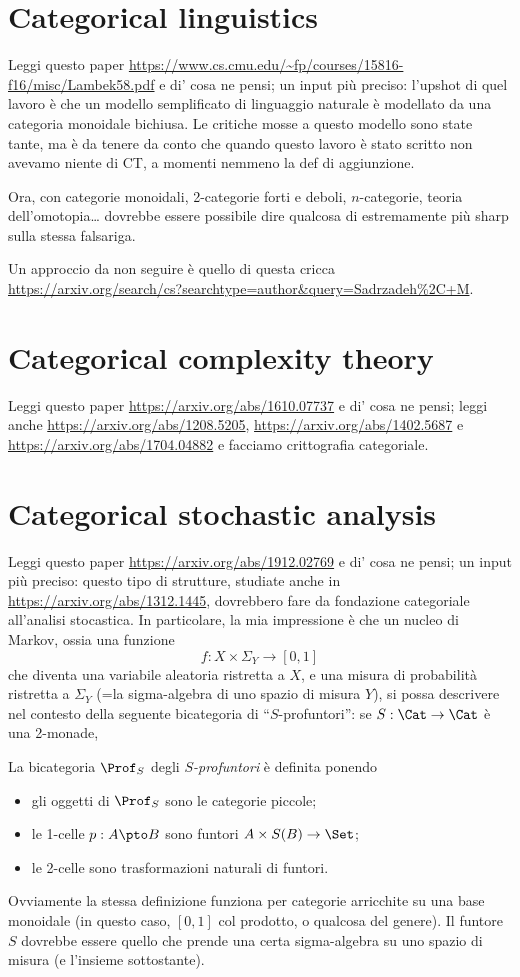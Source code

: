 \documentclass{amsart}
\begin{document}
\section{Categorical linguistics}
Leggi questo paper \url{https://www.cs.cmu.edu/~fp/courses/15816-f16/misc/Lambek58.pdf} e di' cosa ne pensi; un input più preciso: l'upshot di quel lavoro è che un modello semplificato di linguaggio naturale è modellato da una categoria monoidale bichiusa. Le critiche mosse a questo modello sono state tante, ma è da tenere da conto che quando questo lavoro è stato scritto non avevamo niente di CT, a momenti nemmeno la def di aggiunzione.

Ora, con categorie monoidali, 2-categorie forti e deboli, $n$-categorie, teoria dell'omotopia\dots{} dovrebbe essere possibile dire qualcosa di estremamente più sharp sulla stessa falsariga.

Un approccio da non seguire è quello di questa cricca \url{https://arxiv.org/search/cs?searchtype=author&query=Sadrzadeh%2C+M}.
\section{Categorical complexity theory}
Leggi questo paper \url{https://arxiv.org/abs/1610.07737} e di' cosa ne pensi; leggi anche \url{https://arxiv.org/abs/1208.5205}, \url{https://arxiv.org/abs/1402.5687} e \url{https://arxiv.org/abs/1704.04882} e facciamo crittografia categoriale.
\section{Categorical stochastic analysis}
Leggi questo paper \url{https://arxiv.org/abs/1912.02769} e di' cosa ne pensi; un input più preciso: questo tipo di strutture, studiate anche in \url{https://arxiv.org/abs/1312.1445}, dovrebbero fare da fondazione categoriale all'analisi stocastica. In particolare, la mia impressione è che un nucleo di Markov, ossia una funzione
\[
f : X \times \Sigma_Y \to [0,1]
\]
che diventa una variabile aleatoria ristretta a $X$, e una misura di probabilità ristretta a $\Sigma_Y$ (=la sigma-algebra di uno spazio di misura $Y$), si possa descrivere nel contesto della seguente bicategoria di ``$S$-profuntori'': se $S : \Cat \to \Cat$ è una 2-monade,
\begin{definition}
  La bicategoria $\Prof_S$ degli \emph{$S$-profuntori} è definita ponendo 
  \begin{itemize}
    \item gli oggetti di $\Prof_S$ sono le categorie piccole;
    \item le 1-celle $p : A\pto B$ sono funtori $A\times S(B)\to \Set$;
    \item le 2-celle sono trasformazioni naturali di funtori.
  \end{itemize}
\end{definition}
Ovviamente la stessa definizione funziona per categorie arricchite su una base monoidale (in questo caso, $[0,1]$ col prodotto, o qualcosa del genere). Il funtore $S$ dovrebbe essere quello che prende una certa sigma-algebra su uno spazio di misura (e l'insieme sottostante).
\end{document}
